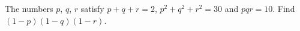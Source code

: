 The numbers $p$, $q$, $r$ satisfy $p+q+r=2$, $p^2+q^2+r^2=30$ and $pqr=10$. Find $(1-p)(1-q)(1-r)$.
